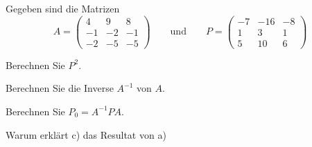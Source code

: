 Gegeben sind die Matrizen
\[
A
=
\begin{pmatrix}
 4& 9& 8\\
-1&-2&-1\\
-2&-5&-5
\end{pmatrix}
\qquad\text{und}\qquad
P
=
\begin{pmatrix}
-7&-16&-8\\
 1&  3& 1\\
 5& 10& 6
\end{pmatrix}
\]
\begin{teilaufgaben}
\item Berechnen Sie $P^2$.
\item Berechnen Sie die Inverse $A^{-1}$ von $A$.
\item Berechnen Sie $P_0=A^{-1}PA$.
\item Warum erklärt c) das Resultat von a)
\end{teilaufgaben}


